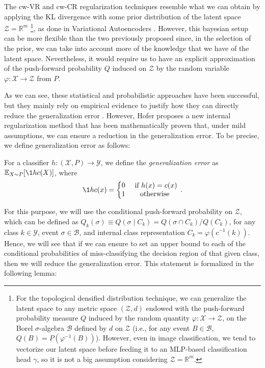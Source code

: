 \documentclass[../main.tex]{subfiles}
\begin{document}
\begin{remark}
The cw-VR and cw-CR regularization techniques resemble what we can obtain by applying the KL divergence with some prior distribution of the latent space  $\mathcal{Z}=\mathbb{R}^m$ \footnote{For the topological densified distribution technique, we can generalize the latent space to any metric space $(\mathcal{Z}, d)$ endowed with the push-forward probability measure $Q$ induced by the random quantity $\varphi: \mathcal{X} \to \mathcal{Z}$, on the Borel $\sigma$-algebra $\mathcal{B}$ defined by $d$ on $\mathcal{Z}$ (i.e., for any event $B\in \mathcal{B}$, $Q(B)= P(\varphi^{-1}(B))$). However, even in image classification, we tend to vectorize our latent space before feeding it to an MLP-based classification head $\gamma$, so it is not a big assumption considering $\mathcal{Z}=\mathbb{R}^m$.}, as done in Variational Autoencoders \cite{kingma_auto-encoding_2022}. However, this bayesian setup can be more flexible than the two previously proposed since, in the selection of the prior, we can take into account more of the knowledge that we have of the latent space. Nevertheless, it would require us to have an explicit approximation of the push-forward probability $Q$ induced on $\mathcal{Z}$ by the random variable $\varphi: \mathcal{X} \to \mathcal{Z}$ from $P$.
\end{remark}

As we can see, these statistical and probabilistic approaches have been successful, but they mainly rely  on empirical evidence to justify how they can directly reduce the generalization error \cite{hofer_densified_2021}. However, Hofer \etal \cite{hofer_densified_2021} proposes a new internal regularization method that has been mathematically proven that, under mild assumptions, we can ensure a reduction in the generalization error. To be precise, we define generalization error as follows:

\begin{definition}
For a classifier $h: (\mathcal{X}, P) \to \mathcal{Y}$, we define the \emph{generalization error} as $\E_{X \sim P}[\1{h}{c}(X)]$, where 
\[
\1{h}{c}(x) = \left\{\begin{matrix}
0 & \text{ if } h(x)=c(x)\\
1 &  \text{ otherwise }\\
\end{matrix}\right.\,.
\]
\end{definition}

For this purpose, we will use the conditional push-forward probability on $\mathcal{Z}$, which can be defined as $Q_k(\sigma)\equiv Q(\sigma \mid C_k) = Q(\sigma \cap C_k)/Q(C_k)$, for any class $k\in \mathcal{Y}$, event $\sigma \in \mathcal{B}$, and internal class representation $C_k=\varphi(c^{-1}(k))$. Hence, we will see that if we can ensure to set an upper bound to each of the conditional probabilities of miss-classifying the decision region of that given class, then we will reduce the generalization error. This statement is formalized in the following lemma:
\end{document}
